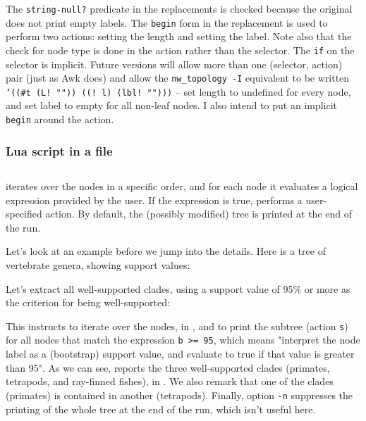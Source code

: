 The {\tt string-null?} predicate in the  replacements is checked
because the original  does not print empty labels. The {\tt begin} form
in the \topology{} replacement is used to perform two actions: setting the
length and setting the label. Note also that the check for node type is done in
the action rather than the selector. The {\tt if} on the selector is implicit.
Future versions will allow more than one (selector, action) pair (just as Awk
does) and allow the {\tt nw\_topology -I} equivalent to be written {\tt '((\#t
(L! "")) ((! l) (lbl! "")))} -- set length to undefined for every node, and set
label to empty for all non-leaf nodes. I also intend to put an implicit {\tt
begin} around the action.

\subsubsection{Lua script in a file}
\label{sct:lua_file_input}

\subsection{\ed}

\ed{} iterates over the nodes in a specific order, and for each node it
evaluates a logical expression provided by the user. If the expression is true,
\ed{} performs a user-specified action.  By default, the (possibly modified)
tree is printed at the end of the run.

Let's look at an example before we jump into the details. Here is a tree of vertebrate genera, showing support values:

\noindent{}Let's extract all well-supported clades, using a support value of 95\% or more as the criterion for being well-supported:


\begin{samepage}

\end{samepage}

\noindent{}This instructs \ed{} to iterate over the nodes, in \no{}, and to
print the subtree (action \texttt{s}) for all nodes that match the expression
\texttt{b >= 95}, which means "interpret the node label as a (bootstrap) support
value, and evaluate to true if that value is greater than 95". As we can see,
\ed{} reports the three well-supported clades (primates, tetrapods, and
ray-finned fishes), in \no. We also remark that one of the clades (primates) is
contained in another (tetrapods). Finally, option \texttt{-n} suppresses
the printing of the whole tree at the end of the run, which isn't useful here.

